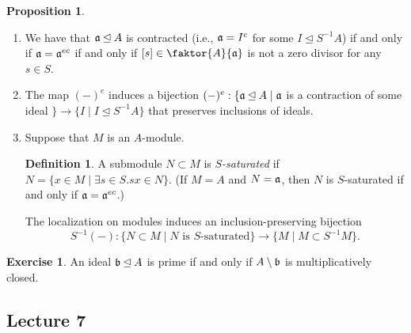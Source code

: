 \documentclass[10pt,letterpaper,cm]{nupset}
\theoremstyle{definition}
\newtheorem*{definition}{Definition}
\newtheorem{prop}{Proposition}
\newtheorem{exercise}{Exercise}
\newcommand{\1}{\mathbf{1}}
\newcommand{\0}{\vec 0}
\begin{document}
\begin{prop}
\begin{enumerate}
\begin{proof}
\end{proof}
\item We have that $\frak{a} \unlhd A$ is contracted (i.e., $\frak{a} = I^c$ for some $I \unlhd S^{-1}A$) if and only if $\frak{a} = \frak{a}^{ec}$ if and only if $[s] \in \faktor{A}{\frak{a}}$ is not a zero divisor for any $s\in S$.
\item The map $(-)^e$ induces a bijection $(-)^e : \{\frak{a} \unlhd A \mid \frak{a}$ is a contraction of some ideal $\} \to \{I \mid I \unlhd S^{-1}A\}$ that preserves inclusions of ideals.
\item Suppose that $M$ is an $A$-module. 
\begin{definition}
A submodule $N \subset M$ is \textit{$S$-saturated} if $N= \{x \in M \mid \exists s \in S. sx\in N\}$. (If $M=A$ and $N= \frak{a}$, then $N$ is $S$-saturated if and only if $\frak{a} = \frak{a}^{ec}$.)
\end{definition} 
The localization on modules induces an inclusion-preserving bijection $$S^{-1}(-) : \{N \subset M \mid N \text{ is } S\text{-saturated}\} \to \{M \mid M \subset S^{-1}M\}.$$
\end{enumerate}
\end{prop}

\begin{exercise}
An ideal $\frak{b} \unlhd A$ is prime if and only if $A \setminus \frak{b}$ is multiplicatively closed. 
\end{exercise}

\subsection{Lecture 7}
\end{document}
